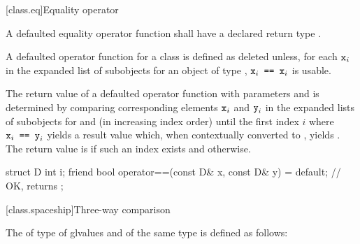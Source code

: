 [class.eq]{Equality operator}
%

\pnum
A defaulted equality operator function
shall have a declared return type .

\pnum
A defaulted \tcode{==} operator function for a class 
is defined as deleted
unless, for each $\tcode{x}_i$ in the expanded list of subobjects
for an object  of type ,
$\tcode{x}_i\tcode{ == }\tcode{x}_i$
is usable.

\pnum
The return value of a defaulted \tcode{==} operator function
with parameters  and  is determined
by comparing corresponding elements $\tcode{x}_i$ and $\tcode{y}_i$
in the expanded lists of subobjects for  and 
(in increasing index order)
until the first index $i$
where $\tcode{x}_i\tcode{ == }\tcode{y}_i$ yields a result value which,
when contextually converted to , yields .
The return value is  if such an index exists
and  otherwise.

\pnum
\begin{example}
\begin{codeblock}
struct D {
  int i;
  friend bool operator==(const D& x, const D& y) = default;
                                                // OK, returns 
};
\end{codeblock}
\end{example}

[class.spaceship]{Three-way comparison}
%

\pnum
The 
of type 
of glvalues  and  of the same type
is defined as follows:

